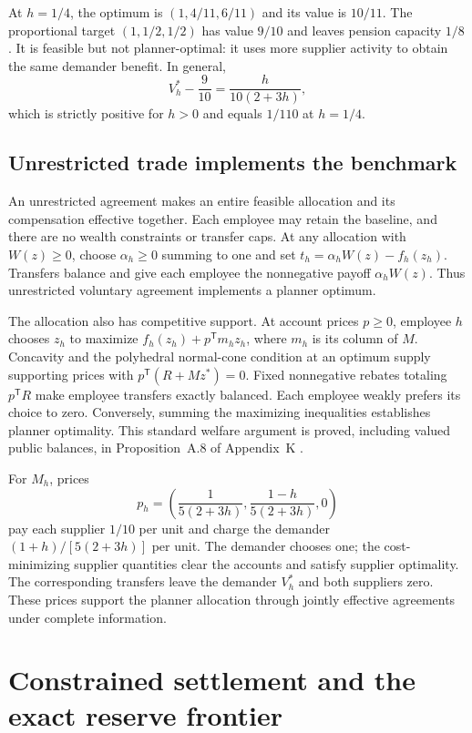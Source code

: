 \documentclass[ecta,draft]{econsocart}
\theoremstyle{definition}
\theoremstyle{definition}
\begin{document}
At $h=1/4$, the optimum is $(1,4/11,6/11)$ and its value is $10/11$.
The proportional target $(1,1/2,1/2)$ has value $9/10$ and leaves pension
capacity $1/8$. It is feasible but not planner-optimal: it uses more supplier
activity to obtain the same demander benefit. In general,
\[
 V_h^*-\frac9{10}=\frac{h}{10(2+3h)},
\]
which is strictly positive for $h>0$ and equals $1/110$ at $h=1/4$.

\subsection{Unrestricted trade implements the benchmark}
\label{sec:trade}

An unrestricted agreement makes an entire feasible allocation and its
compensation effective together. Each employee may retain the baseline, and
there are no wealth constraints or transfer caps. At any allocation with
$W(z)\geq0$, choose $\alpha_h\geq0$ summing to one and set
$t_h=\alpha_hW(z)-f_h(z_h)$. Transfers balance and give each employee the
nonnegative payoff $\alpha_hW(z)$. Thus unrestricted voluntary agreement
implements a planner optimum.

The allocation also has competitive support. At account prices $p\geq0$,
employee $h$ chooses $z_h$ to maximize $f_h(z_h)+p^{\mathsf T}m_hz_h$,
where $m_h$ is its column of $M$. Concavity and the polyhedral normal-cone
condition at an optimum supply supporting prices with
$p^{\mathsf T}(R+Mz^*)=0$. Fixed nonnegative rebates totaling
$p^{\mathsf T}R$ make employee transfers exactly balanced. Each employee
weakly prefers its choice to zero. Conversely, summing the maximizing
inequalities establishes planner optimality. This standard welfare argument
\citep{ArrowDebreu1954,BoydVandenberghe2004} is proved, including valued public
balances, in Proposition~A.8%
 of
Appendix~K%
.

For $M_h$, prices
\[
 p_h=\left(\frac1{5(2+3h)},
                 \frac{1-h}{5(2+3h)},0\right)
\]
pay each supplier $1/10$ per unit and charge the demander
$(1+h)/[5(2+3h)]$ per unit. The demander chooses one; the cost-minimizing
supplier quantities clear the accounts and satisfy supplier optimality.
The corresponding transfers leave the demander $V_h^*$ and both suppliers
zero. These prices support the planner allocation through jointly effective
agreements under complete information.

\section{Constrained settlement and the exact reserve frontier}
\label{sec:recovery}\label{sec:institution}
\label{sec:sequential}\label{sec:sharpseeds}\label{sec:seeddesign}
\end{document}
